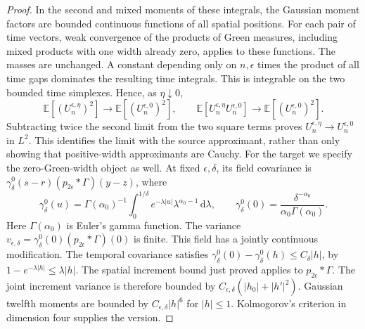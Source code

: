 \documentclass[12pt]{article}
\numberwithin{equation}{section}
\theoremstyle{definition}
\newcommand{\E}{\mathbb{E}}
\newcommand{\ud}{\,\mathrm{d}}
\begin{document}
\begin{proof}
  In the second and mixed moments of these integrals, the Gaussian
  moment factors are bounded continuous functions of all spatial
  positions. For each pair of time vectors, weak convergence of the
  products of Green measures, including mixed products with one width
  already zero, applies to these functions. The masses are unchanged.
  A constant depending only on $n,\epsilon$ times the product of all
  time gaps dominates the resulting time integrals. This is integrable
  on the two bounded time simplexes. Hence, as $\eta\downarrow0$,
  \[
    \E\left[(U_n^{\epsilon,\eta})^2\right]
    \longrightarrow\E\left[(U_n^{\epsilon,0})^2\right],
    \qquad
    \E\left[U_n^{\epsilon,\eta}U_n^{\epsilon,0}\right]
    \longrightarrow\E\left[(U_n^{\epsilon,0})^2\right].
  \]
  Subtracting twice the second limit from the two square terms proves
  $U_n^{\epsilon,\eta}\to U_n^{\epsilon,0}$ in $L^2$.
  This identifies the limit with the source approximant, rather than
  only showing that positive-width approximants are Cauchy.
  For the target we specify the zero-Green-width object as well.
  At fixed $\epsilon,\delta$, its field covariance is
  $\gamma_\delta^0(s-r)(p_{2\epsilon}*\Gamma)(y-z)$, where
  \[
    \gamma_\delta^0(u)
    =\Gamma(\alpha_0)^{-1}\int_0^{1/\delta}
    e^{-\lambda|u|}\lambda^{\alpha_0-1}\ud\lambda,\qquad
    \gamma_\delta^0(0)
    =\frac{\delta^{-\alpha_0}}{\alpha_0\Gamma(\alpha_0)}.
  \]
  Here $\Gamma(\alpha_0)$ is Euler's gamma function.
  The variance
  $v_{\epsilon,\delta}
  =\gamma_\delta^0(0)(p_{2\epsilon}*\Gamma)(0)$ is finite.
  This field has a jointly continuous modification. The temporal
  covariance satisfies
  $\gamma_\delta^0(0)-\gamma_\delta^0(h)\le C_\delta|h|$,
  by $1-e^{-\lambda|h|}\le\lambda|h|$.
  The spatial increment bound just proved applies to
  $p_{2\epsilon}*\Gamma$. The joint increment variance is therefore
  bounded by $C_{\epsilon,\delta}(|h_0|+|h'|^2)$.
  Gaussian twelfth moments are bounded by
  $C_{\epsilon,\delta}|h|^6$ for $|h|\le1$.
  Kolmogorov's criterion in dimension four supplies the version.


\end{proof}
\end{document}
